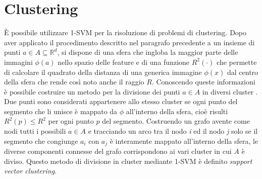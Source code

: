 \documentclass [11pt,a4paper,twoside,openright] {book}
\begin{document}
\section{Clustering}
È possibile utilizzare 1-SVM per la risoluzione di problemi di clustering. Dopo aver applicato il procedimento descritto nel paragrafo precedente a un insieme di punti $a \in A \subseteq \mathbb{R}^d$, si dispone di una sfera che ingloba la maggior parte delle immagini $\phi(a)$ nello spazio delle feature e di una funzione $R^2(\cdot)$ che permette di calcolare il quadrato della distanza di una generica immagine $\phi(x)$ dal centro della sfera che rende così noto anche il raggio $R$. Conoscendo queste informazioni è possibile costruire un metodo per la divisione dei punti $a \in A$ in diversi cluster \cite{ben2001support}. Due punti sono considerati appartenere allo stesso cluster se ogni punto del segmento che li unisce è mappato da $\phi$ all'interno della sfera, cioè risulti $R^2(p) \leq R^2$ per ogni punto $p$ del segmento. Costruendo un grafo avente come nodi tutti i possibili $a \in A$ e tracciando un arco tra il nodo \textit{i} ed  il nodo \textit{j} solo se il segmento che congiunge $a_i$ con $a_j$ è interamente mappato all'interno della sfera, le diverse componenti connesse del grafo corrispondono ai vari cluster in cui $A$ è diviso. Questo metodo di divisione in cluster mediante 1-SVM è definito \textit{support vector clustering}.
\end{document}

